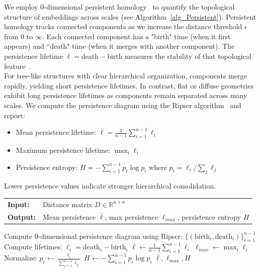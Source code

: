 \documentclass[]{Liebert_Author_revised}
\begin{document}
We employ 0-dimensional persistent homology~\citeauthor{edelsbrunner2008persistent, carlsson2009topology} to quantify the topological structure of embeddings across scales (see Algorithm~\ref{alg_Persistent}). Persistent homology tracks connected components as we increase the distance threshold $\epsilon$ from 0 to $\infty$. Each connected component has a "birth" time (when it first appears) and ``death" time (when it merges with another component). The persistence lifetime $\ell = \text{death} - \text{birth}$ measures the stability of that topological feature~\citeauthor{chazal2016structure}.
\\
For tree-like structures with clear hierarchical organization, components merge rapidly, yielding short persistence lifetimes. In contrast, flat or diffuse geometries exhibit long persistence lifetimes as components remain separated across many scales. We compute the persistence diagram using the Ripser algorithm~\citeauthor{bauer2021ripser} and report:
\begin{itemize}
\item Mean persistence lifetime: $\bar{\ell} = \frac{1}{n-1}\sum_{i=1}^{n-1} \ell_i$
\item Maximum persistence lifetime: $\max_i \ell_i$
\item Persistence entropy: $H = -\sum_{i=1}^{n-1} p_i \log p_i$ where 
      $p_i = \ell_i / \sum_j \ell_j$
\end{itemize}
Lower persistence values indicate stronger hierarchical consolidation.

\begin{algorithm}[h!]
\caption{Compute Persistent Homology Features}
\label{alg_Persistent}
\small
\noindent
\begin{tabular}{p{1cm}p{7cm}}
\textbf{Input:}  & Distance matrix $D \in \mathbb{R}^{n \times n}$ \\
\textbf{Output:} & Mean persistence $\bar{\ell}$, max persistence $\ell_{max}$, persistence entropy $H$
\end{tabular}
\begin{algorithmic}[1]
\STATE Compute 0-dimensional persistence diagram using Ripser: 
       $\{(\text{birth}_i, \text{death}_i)\}_{i=1}^{n-1}$
\STATE Compute lifetimes: $\ell_i = \text{death}_i - \text{birth}_i$
\STATE $\bar{\ell} \leftarrow \frac{1}{n-1}\sum_{i=1}^{n-1} \ell_i$
\STATE $\ell_{max} \leftarrow \max_{i} \ell_i$
\STATE Normalize: $p_i \leftarrow \frac{\ell_i}{\sum_{j=1}^{n-1} \ell_j}$
\STATE $H \leftarrow -\sum_{i=1}^{n-1} p_i \log p_i$
\RETURN $\bar{\ell}, \ell_{max}, H$
\end{algorithmic}
\end{algorithm}
\end{document}
